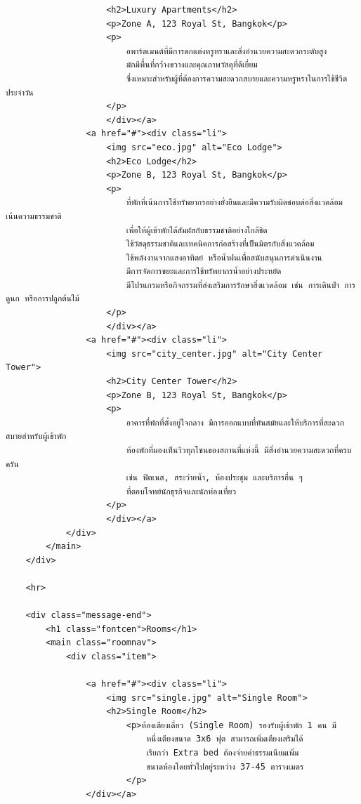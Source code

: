 \documentclass{report}
\begin{document}
\begin{verbatim}
                    <h2>Luxury Apartments</h2>
                    <p>Zone A, 123 Royal St, Bangkok</p>
                    <p>
                        อพาร์ตเมนต์ที่มีการตกแต่งหรูหราและสิ่งอำนวยความสะดวกระดับสูง 
                        มักมีพื้นที่กว้างขวางและคุณภาพวัสดุที่ดีเยี่ยม 
                        ซึ่งเหมาะสำหรับผู้ที่ต้องการความสะดวกสบายและความหรูหราในการใช้ชีวิตประจำวัน     
                    </p>
                    </div></a>
                <a href="#"><div class="li">
                    <img src="eco.jpg" alt="Eco Lodge">
                    <h2>Eco Lodge</h2>
                    <p>Zone B, 123 Royal St, Bangkok</p>
                    <p>
                        ที่พักที่เน้นการใช้ทรัพยากรอย่างยั่งยืนและมีความรับผิดชอบต่อสิ่งแวดล้อม เน้นความธรรมชาติ
                        เพื่อให้ผู้เข้าพักได้สัมผัสกับธรรมชาติอย่างใกล้ชิด 
                        ใช้วัสดุธรรมชาติและเทคนิคการก่อสร้างที่เป็นมิตรกับสิ่งแวดล้อม
                        ใช้พลังงานจากแสงอาทิตย์ หรือน้ำฝนเพื่อสนับสนุนการดำเนินงาน
                        มีการจัดการขยะและการใช้ทรัพยากรน้ำอย่างประหยัด
                        มีโปรแกรมหรือกิจกรรมที่ส่งเสริมการรักษาสิ่งแวดล้อม เช่น การเดินป่า การดูนก หรือการปลูกต้นไม้           
                    </p>
                    </div></a>
                <a href="#"><div class="li">
                    <img src="city_center.jpg" alt="City Center Tower">     
                    <h2>City Center Tower</h2>
                    <p>Zone B, 123 Royal St, Bangkok</p>
                    <p>
                        อาคารที่พักที่ตั้งอยู่ใจกลาง มีการออกแบบที่ทันสมัยและให้บริการที่สะดวกสบายสำหรับผู้เข้าพัก
                        ห้องพักที่มองเห็นวิวทุกโซนของสถานที่แห่งนี้ มีสิ่งอำนวยความสะดวกที่ครบครัน
                        เช่น ฟิตเนส, สระว่ายน้ำ, ห้องประชุม และบริการอื่น ๆ 
                        ที่ตอบโจทย์นักธุรกิจและนักท่องเที่ยว            
                    </p>
                    </div></a>
            </div>
        </main>
    </div>

    <hr>

    <div class="message-end">
        <h1 class="fontcen">Rooms</h1>
        <main class="roomnav">
            <div class="item">

                <a href="#"><div class="li">
                    <img src="single.jpg" alt="Single Room">
                    <h2>Single Room</h2>
                        <p>ห้องเตียงเดี่ยว (Single Room) รองรับผู้เข้าพัก 1 คน มี
                            หนึ่งเตียงขนาด 3x6 ฟุต สามารถเพิ่มเตียงเสริมได้ 
                            เรียกว่า Extra bed ต้องจ่ายค่าธรรมเนียมเพิ่ม 
                            ขนาดห้องโดยทั่วไปอยู่ระหว่าง 37-45 ตารางเมตร
                        </p>
                </div></a>


\end{verbatim}
\end{document}
